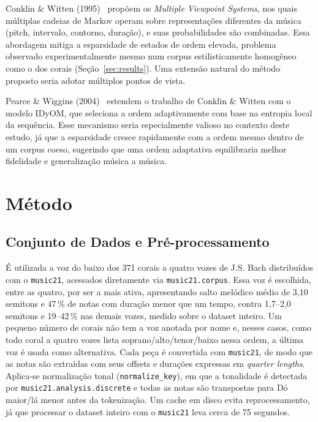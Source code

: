 \documentclass{article}
\begin{document}
Conklin \& Witten (1995)~\cite{Conklin1995:multiple} propõem os \emph{Multiple
  Viewpoint Systems}, nos quais múltiplas cadeias de Markov operam sobre
representações diferentes da música (pitch, intervalo, contorno, duração), e
suas probabilidades são combinadas. Essa abordagem mitiga a esparsidade de
estados de ordem elevada, problema observado experimentalmente mesmo num
corpus estilisticamente homogêneo como o dos corais (Seção~\ref{sec:results}).
Uma extensão natural do método proposto seria adotar múltiplos pontos de
vista.

Pearce \& Wiggins (2004)~\cite{Pearce2004:methods} estendem o trabalho de
Conklin \& Witten com o modelo IDyOM, que seleciona a ordem adaptivamente com
base na entropia local da sequência. Esse mecanismo seria especialmente valioso
no contexto deste estudo, já que a esparsidade cresce rapidamente com a ordem
mesmo dentro de um corpus coeso, sugerindo que uma ordem adaptativa equilibraria
melhor fidelidade e generalização música a música.

\section{Método}\label{sec:method}

\subsection{Conjunto de Dados e Pré-processamento}

É utilizada a voz do baixo dos 371 corais a quatro vozes de J.S. Bach
distribuídos com o \texttt{music21}, acessados diretamente via
\texttt{music21.corpus}. Essa voz é escolhida, entre as quatro, por ser a mais
ativa, apresentando salto melódico médio de 3,10 semitons e 47\,\% de notas com
duração menor que um tempo, contra 1,7--2,0 semitons e 19--42\,\% nas demais
vozes, medido sobre o dataset inteiro. Um pequeno número de corais não tem a voz
anotada por nome e, nesses casos, como todo coral a quatro vozes lista
soprano/alto/tenor/baixo nessa ordem, a última voz é usada como alternativa.
Cada peça é convertida com \texttt{music21}, de modo que as notas são extraídas
com seus offsets e durações expressas em \emph{quarter lengths}. Aplica-se
normalização tonal (\texttt{normalize\_key}), em que a tonalidade é detectada
por \texttt{music21.analysis.discrete} e todas as notas são transpostas para Dó
maior/lá menor antes da tokenização. Um cache em disco evita reprocessamento, já
que processar o dataset inteiro com o \texttt{music21} leva cerca de 75
segundos.
\end{document}
